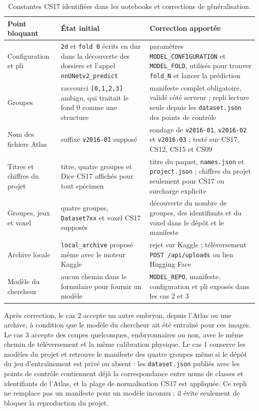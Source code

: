 \documentclass[12pt,a4paper]{report}
\begin{document}
\begin{table}[H]
\centering
\footnotesize
\begin{tabularx}{\textwidth}{@{}>{\raggedright\arraybackslash}p{3.1cm}>{\raggedright\arraybackslash}X>{\raggedright\arraybackslash}p{5.4cm}@{}}
\toprule
\textbf{Point bloquant} & \textbf{État initial} & \textbf{Correction apportée} \\
\midrule
Configuration et pli & \texttt{2d} et \texttt{fold 0} écrits en dur dans la découverte des dossiers et l'appel \texttt{nnUNetv2\_predict} & paramètres \texttt{MODEL\_CONFIGURATION} et \texttt{MODEL\_FOLD}, utilisés pour trouver \texttt{fold\_N} et lancer la prédiction \\
Groupes & raccourci \texttt{[0,1,2,3]} ambigu, qui traitait le fond 0 comme une structure & manifeste complet obligatoire, validé côté serveur ; repli lecture seule depuis les \texttt{dataset.json} des points de contrôle \\
Nom des fichiers Atlas & suffixe \texttt{v2016-01} supposé & sondage de \texttt{v2016-01}, \texttt{v2016-02} et \texttt{v2016-03} ; testé sur CS17, CS12, CS15 et CS09 \\
Titres et chiffres du projet & titre, quatre groupes et Dice CS17 affichés pour tout spécimen & titre du paquet, \texttt{names.json} et \texttt{project.json} ; chiffres du projet seulement pour CS17 ou surcharge explicite \\
Groupes, jeux et voxel & quatre groupes, \texttt{Dataset7xx} et voxel CS17 supposés & découverte du nombre de groupes, des identifiants et du voxel dans le dépôt et le manifeste \\
Archive locale & \texttt{local\_archive} proposé même avec le moteur Kaggle & rejet sur Kaggle ; téléversement \texttt{POST /api/uploads} ou lien Hugging Face \\
Modèle du chercheur & aucun chemin dans le formulaire pour fournir un modèle & \texttt{MODEL\_REPO}, manifeste, configuration et pli exposés dans les cas 2 et 3 \\
\bottomrule
\end{tabularx}
\caption{Constantes CS17 identifiées dans les notebooks et corrections de généralisation.}
\label{tab:generality}
\end{table}

Après correction, le cas 2 accepte un autre embryon, depuis l'Atlas ou une archive, à condition que le modèle du chercheur ait été entraîné pour ces images. Le cas 3 accepte des coupes quelconques, embryonnaires ou non, avec le même chemin de téléversement et la même calibration physique. Le cas 1 conserve les modèles du projet et retrouve le manifeste des quatre groupes même si le dépôt du jeu d'entraînement est privé ou absent : les \texttt{dataset.json} publiés avec les points de contrôle contiennent déjà la correspondance entre noms de classes et identifiants de l'Atlas, et la plage de normalisation CS17 est appliquée. Ce repli ne remplace pas un manifeste pour un modèle inconnu ; il évite seulement de bloquer la reproduction du projet.
\end{document}
